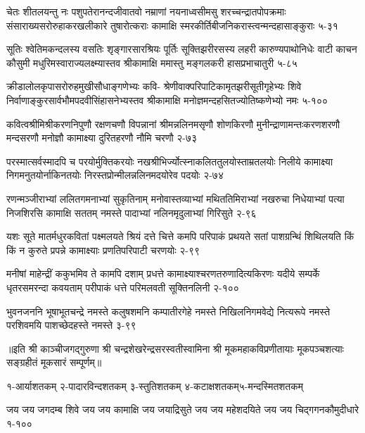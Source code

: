 \annofourlineindentedshloka
{चेतः शीतलयन्तु नः पशुपतेरानन्दजीवातवो}
{नम्राणां नयनाध्वसीमसु शरच्चन्द्रातपोपक्रमाः}
{संसाराख्यसरोरुहाकरखलीकारे तुषारोत्कराः}
{कामाक्षि स्मरकीर्तिबीजनिकरास्त्वन्मन्दहासाङ्कुराः}
{५-३१}

\annofourlineindentedshloka
{सूतिः श्वेतिमकन्दलस्य वसतिः शृङ्गारसारश्रियः}
{पूर्तिः सूक्तिझरीरसस्य लहरी कारुण्यपाथोनिधेः}
{वाटी काचन कौसुमी मधुरिमस्वाराज्यलक्ष्म्यास्तव}
{श्रीकामाक्षि ममास्तु मङ्गलकरी हासप्रभाचातुरी}
{५-८५}

\annofourlineindentedshloka
{क्रीडालोलकृपासरोरुहमुखीसौधाङ्गणेभ्यः कवि-}
{श्रेणीवाक्परिपाटिकामृतझरीसूतीगृहेभ्यः शिवे}
{निर्वाणाङ्कुरसार्वभौमपदवीसिंहासनेभ्यस्तव}
{श्रीकामाक्षि मनोज्ञमन्दहसितज्योतिष्कणेभ्यो नमः}
{५-१००}

\annofourlineindentedshloka
{कवित्वश्रीमिश्रीकरणनिपुणौ रक्षणचणौ}
{विपन्नानां श्रीमन्नलिनमसृणौ शोणकिरणौ}
{मुनीन्द्राणामन्तःकरणशरणौ मन्दसरणौ}
{मनोज्ञौ कामाक्ष्या दुरितहरणौ नौमि चरणौ}
{२-७३}

\annofourlineindentedshloka
{परस्मात्सर्वस्मादपि च परयोर्मुक्तिकरयोः}
{नखश्रीभिर्ज्योत्स्नाकलिततुलयोस्ताम्रतलयोः}
{निलीये कामाक्ष्या निगमनुतयोर्नाकिनतयोः}
{निरस्तप्रोन्मीलन्नलिनमदयोरेव पदयोः}
{२-७४}

\annofourlineindentedshloka
{रणन्मञ्जीराभ्यां ललितगमनाभ्यां सुकृतिनाम्}
{मनोवास्तव्याभ्यां मथिततिमिराभ्यां नखरुचा}
{निधेयाभ्यां पत्या निजशिरसि कामाक्षि सततम्}
{नमस्ते पादाभ्यां नलिनमृदुलाभ्यां गिरिसुते}
{२-९६}

\annofourlineindentedshloka
{यशः सूते मातर्मधुरकवितां पक्ष्मलयते}
{श्रियं दत्ते चित्ते कमपि परिपाकं प्रथयते}
{सतां पाशग्रन्थिं शिथिलयति किं किं न कुरुते}
{प्रपन्ने कामाक्ष्याः प्रणतिपरिपाटी चरणयोः}
{२-९९}

\annofourlineindentedshloka
{मनीषां माहेन्द्रीं ककुभमिव ते कामपि दशाम्}
{प्रधत्ते कामाक्ष्याश्चरणतरुणादित्यकिरणः}
{यदीये सम्पर्के धृतरसमरन्दा कवयताम्}
{परीपाकं धत्ते परिमलवती सूक्तिनलिनी}
{२-१००}

\annofourlineindentedshloka
{भुवनजननि भूषाभूतचन्द्रे नमस्ते}
{कलुषशमनि कम्पातीरगेहे नमस्ते}
{निखिलनिगमवेद्ये नित्यरूपे नमस्ते}
{परशिवमयि पाशच्छेदहस्ते नमस्ते}
{३-९९}

॥इति श्री काञ्चीजगद्गुरुणा श्री चन्द्रशेखरेन्द्रसरस्वतीस्वामिना श्री मूकमहाकविप्रणीतायाः मूकपञ्चशत्याः सङ्ग्रहीतं मूकसारं सम्पूर्णम्॥

{\footnotesize{१-आर्याशतकम् \quad २-पादारविन्दशतकम् \quad ३-स्तुतिशतकम् \quad ४-कटाक्षशतकम्\quad ५-मन्दस्मितशतकम्}}

\closesection
\annofourlineindentedshloka
{जय जय जगदम्ब शिवे}
{जय जय कामाक्षि जय जयाद्रिसुते}
{जय जय महेशदयिते}
{जय जय चिद्गगनकौमुदीधारे}
{१-१००}